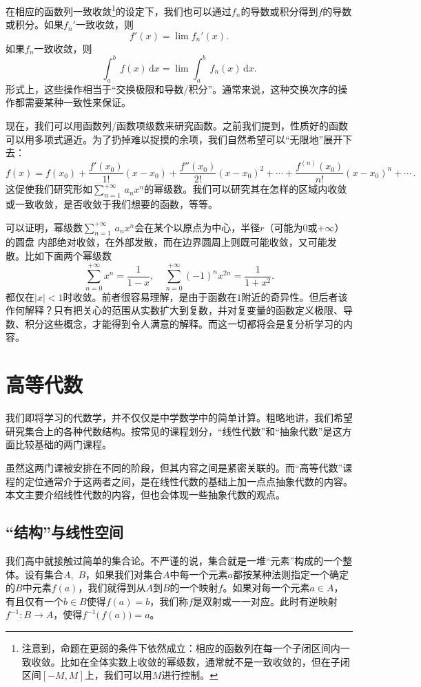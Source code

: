 在相应的函数列一致收敛\footnote{注意到，命题在更弱的条件下依然成立：相应的函数列在每一个子闭区间内一致收敛。比如在全体实数上收敛的幂级数，通常就不是一致收敛的，但在子闭区间$[-M,M]$上，我们可以用$M$进行控制。}的设定下，我们也可以通过$f_n$的导数或积分得到$f$的导数或积分。如果$f_n'$一致收敛，则
\[f'(x)=\lim f_n'(x).\]
如果$f_n$一致收敛，则
\[\int_a^b\,f(x)\,\mathrm{d}x=\lim \int_a^b\,f_n(x)\,\mathrm{d}x.\]
形式上，这些操作相当于“交换极限和导数/积分”。通常来说，这种交换次序的操作都需要某种一致性来保证。

现在，我们可以用函数列/函数项级数来研究函数。之前我们提到，性质好的函数可以用多项式逼近。为了扔掉难以捉摸的余项，我们自然希望可以“无限地”展开下去：
\[f(x)=f(x_0)+\frac{f'(x_0)}{1!}(x-x_0)+\frac{f''(x_0)}{2!}(x-x_0)^2 +\cdots+\frac{f^{(n)}(x_0)}{n!}(x-x_0)^n+\cdots\, .\]
这促使我们研究形如$\sum_{n=1}^{+\infty}\,a_nx^n$的幂级数。我们可以研究其在怎样的区域内收敛或一致收敛，是否收敛于我们想要的函数，等等。

可以证明，幂级数$\sum_{n=1}^{+\infty}\,a_nx^n$会在某个以原点为中心，半径$r$（可能为$0$或$+\infty$）的圆盘 内部绝对收敛，在外部发散，而在边界圆周上则既可能收敛，又可能发散。比如下面两个幂级数
\[\sum_{n=0}^{+\infty}x^n=\frac 1{1-x},\quad \sum_{n=0}^{+\infty}(-1)^nx^{2n}=\frac{1}{1+x^2}.\]
都仅在$|x|<1$时收敛。前者很容易理解，是由于函数在$1$附近的奇异性。但后者该作何解释？只有把关心的范围从实数扩大到复数，并对复变量的函数定义极限、导数、积分这些概念，才能得到令人满意的解释。而这一切都将会是复分析学习的内容。

\section{高等代数}
我们即将学习的代数学，并不仅仅是中学数学中的简单计算。粗略地讲，我们希望研究集合上的各种代数结构。按常见的课程划分，“线性代数”和“抽象代数”是这方面比较基础的两门课程。

虽然这两门课被安排在不同的阶段，但其内容之间是紧密关联的。而“高等代数”课程的定位通常介于这两者之间，是在线性代数的基础上加一点点抽象代数的内容。
本文主要介绍线性代数的内容，但也会体现一些抽象代数的观点。
\subsection{“结构”与线性空间}
我们高中就接触过简单的集合论。不严谨的说，集合就是一堆“元素”构成的一个整体。设有集合$A$,~$B$，如果我们对集合$A$中每一个元素$a$都按某种法则指定一个确定的$B$中元素$f(a)$，我们就得到从$A$到$B$的一个映射$f$。如果对每一个元素$a\in A$，有且仅有一个$b\in B$使得$f(a)=b$，我们称$f$是双射或一一对应。此时有逆映射$f^{-1}:B\to A$，使得$f^{-1}\bigl(\,f(a)\bigr)=a$。


